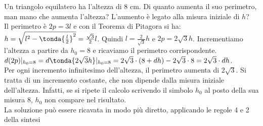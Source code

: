 \begin{esempio}
Un triangolo equilatero ha l'altezza di $8$ cm. 
Di quanto aumenta il suo perimetro, man mano che aumenta l'altezza? 
L'aumento è legato alla misura iniziale di $h$?\\
Il perimetro è $2p=3l$ e con il Teorema di Pitagora si ha: 
$h=\sqrt{l^2-\tonda{\frac{l}{2}}^2}=\frac{\sqrt{3}}{2}l$. 
Quindi $l=\frac{2}{\sqrt{3}}h$ e $2p=2\sqrt{3}h$. 
Incrementiamo l'altezza a partire da $h_0=8$ e ricaviamo il perimetro 
corrispondente.\\
$d(2p)|_{h_0=8}=
d\tonda{2\sqrt{3}h}|_{h_0=8}=
2 \sqrt{3} \cdot (8+dh)-2\sqrt{3} \cdot 8 = 2 \sqrt{3} \cdot dh$.\\
Per ogni incremento infinitesimo dell'altezza, il perimetro aumenta di 
$2 \sqrt{3}$.
Si tratta di un incremento costante, che non dipende dalla misura iniziale
dell'altezza. Infatti, se si ripete il calcolo scrivendo il simbolo $h_0$ al 
posto della 
sua misura $8$, $h_0$ non compare nel risultato.\\
La soluzione può essere ricavata in modo più diretto, applicando le regole
4 e 2 della sintesi %
\end{esempio}

